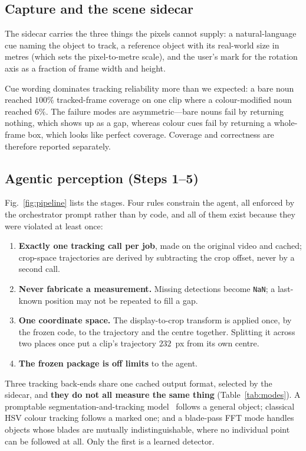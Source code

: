 \documentclass[conference]{IEEEtran}
\begin{document}
\subsection{Capture and the scene sidecar}

The sidecar carries the three things the pixels cannot supply: a
natural-language cue naming the object to track, a reference object with its
real-world size in metres (which sets the pixel-to-metre scale), and the user's
mark for the rotation axis as a fraction of frame width and height.

Cue wording dominates tracking reliability more than we expected: a bare noun
reached $100\%$ tracked-frame coverage on one clip where a colour-modified noun
reached $6\%$. The failure modes are asymmetric---bare nouns fail by returning
nothing, which shows up as a gap, whereas colour cues fail by returning a
whole-frame box, which looks like perfect coverage. Coverage and correctness are
therefore reported separately.

\subsection{Agentic perception (Steps 1--5)}

Fig.~\ref{fig:pipeline} lists the stages. Four rules constrain the agent, all
enforced by the orchestrator prompt rather than by code, and all of them exist
because they were violated at least once:

\begin{enumerate}
\item \textbf{Exactly one tracking call per job}, made on the original video
and cached; crop-space trajectories are derived by subtracting the crop offset,
never by a second call.
\item \textbf{Never fabricate a measurement.} Missing detections become
\texttt{NaN}; a last-known position may not be repeated to fill a gap.
\item \textbf{One coordinate space.} The display-to-crop transform is applied
once, by the frozen code, to the trajectory and the centre together. Splitting
it across two places once put a clip's trajectory $232$~px from its own centre.
\item \textbf{The frozen package is off limits} to the agent.
\end{enumerate}

Three tracking back-ends share one cached output format, selected by the
sidecar, and \textbf{they do not all measure the same thing}
(Table~\ref{tab:modes}). A promptable segmentation-and-tracking
model~\cite{sam} follows a general object; classical HSV colour tracking
follows a marked one; and a blade-pass FFT mode handles objects whose blades
are mutually indistinguishable, where no individual point can be followed at
all. Only the first is a learned detector.
\end{document}

